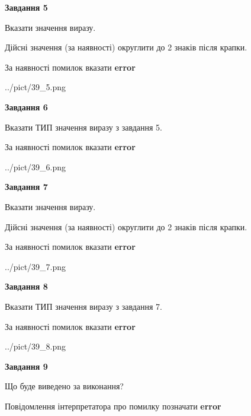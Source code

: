 \documentclass[11pt, ukrainian]{article}
\begin{document}
{\begin {large}
{\begin {center}\textbf{Завдання 5}\end {center}}\par
Вказати значення виразу. \par
Дійсні значення (за наявності) округлити до 2 знаків після крапки. \par
За наявності помилок вказати \textbf{error}

\begin{center}
	{../pict/39_5.png}
\end{center}
\newpage

{\begin {center}\textbf{Завдання 6}\end {center}}\par
Вказати ТИП значення виразу з завдання 5. \par
За наявності помилок вказати \textbf{error}

\begin{center}
	{../pict/39_6.png}
\end{center}
\newpage

{\begin {center}\textbf{Завдання 7}\end {center}}\par
Вказати значення виразу. \par
Дійсні значення (за наявності) округлити до 2 знаків після крапки. \par
За наявності помилок вказати \textbf{error}

\begin{center}
	{../pict/39_7.png}
\end{center}
\newpage

{\begin {center}\textbf{Завдання 8}\end {center}}\par
Вказати ТИП значення виразу з завдання 7. \par
За наявності помилок вказати \textbf{error}

\begin{center}
	{../pict/39_8.png}
\end{center}
\newpage

{\begin {center}\textbf{Завдання 9}\end {center}}\par
Що буде виведено за виконання? \par
Повідомлення інтерпретатора про помилку позначати \textbf{error}


\end{large}}
\end{document}
